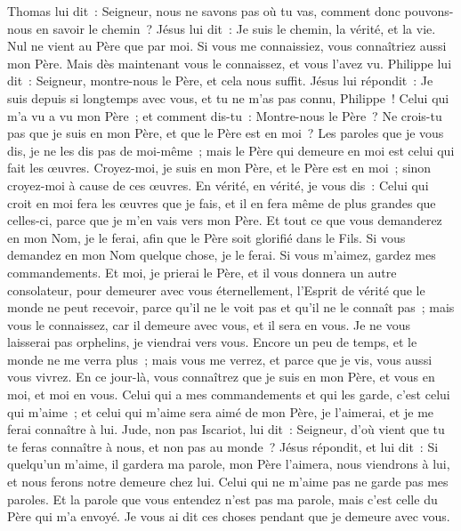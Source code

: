 \begin{multicols}{2}
Thomas lui dit~: Seigneur, nous ne savons pas où tu vas, comment donc pouvons-nous en savoir le chemin~?
Jésus lui dit~: Je suis le chemin, la vérité, et la vie. Nul ne vient au Père que par moi.
Si vous me connaissiez, vous connaîtriez aussi mon Père. Mais dès maintenant vous le connaissez, et vous l'avez vu.
Philippe lui dit~: Seigneur, montre-nous le Père, et cela nous suffit.
Jésus lui répondit~: Je suis depuis si longtemps avec vous, et tu ne m'as pas connu, Philippe~! Celui qui m'a vu a vu mon Père~; et comment dis-tu~: Montre-nous le Père~?
Ne crois-tu pas que je suis en mon Père, et que le Père est en moi~? Les paroles que je vous dis, je ne les dis pas de moi-même~; mais le Père qui demeure en moi est celui qui fait les œuvres.
Croyez-moi, je suis en mon Père, et le Père est en moi~; sinon croyez-moi à cause de ces œuvres.
En vérité, en vérité, je vous dis~: Celui qui croit en moi fera les œuvres que je fais, et il en fera même de plus grandes que celles-ci, parce que je m'en vais vers mon Père.
Et tout ce que vous demanderez en mon Nom, je le ferai, afin que le Père soit glorifié dans le Fils.
Si vous demandez en mon Nom quelque chose, je le ferai.
Si vous m'aimez, gardez mes commandements.
Et moi, je prierai le Père, et il vous donnera un autre consolateur, pour demeurer avec vous éternellement,
l'Esprit de vérité que le monde ne peut recevoir, parce qu'il ne le voit pas et qu'il ne le connaît pas~; mais vous le connaissez, car il demeure avec vous, et il sera en vous.
Je ne vous laisserai pas orphelins, je viendrai vers vous.
Encore un peu de temps, et le monde ne me verra plus~; mais vous me verrez, et parce que je vis, vous aussi vous vivrez.
En ce jour-là, vous connaîtrez que je suis en mon Père, et vous en moi, et moi en vous.
Celui qui a mes commandements et qui les garde, c'est celui qui m'aime~; et celui qui m'aime sera aimé de mon Père, je l'aimerai, et je me ferai connaître à lui.
Jude, non pas Iscariot, lui dit~: Seigneur, d'où vient que tu te feras connaître à nous, et non pas au monde~?
Jésus répondit, et lui dit~: Si quelqu'un m'aime, il gardera ma parole, mon Père l'aimera, nous viendrons à lui, et nous ferons notre demeure chez lui.
Celui qui ne m'aime pas ne garde pas mes paroles. Et la parole que vous entendez n'est pas ma parole, mais c'est celle du Père qui m'a envoyé.
Je vous ai dit ces choses pendant que je demeure avec vous.

\end{multicols}
